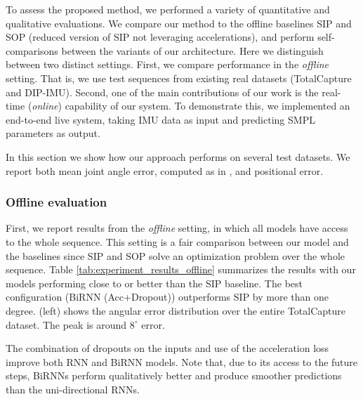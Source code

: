 \documentclass[acmtog]{acmart}
\begin{document}
To assess the proposed method, we performed a variety of quantitative and qualitative evaluations. We compare our method to the offline baselines SIP \cite{von2017sparse} and SOP (reduced version of SIP not leveraging accelerations), and perform self-comparisons between the variants of our architecture. Here we distinguish between two distinct settings. First, we compare performance in the \emph{offline} setting. That is, we use test sequences from existing real datasets (TotalCapture and DIP-IMU). Second, one of the main contributions of our work is the real-time (\emph{online}) capability of our system. To demonstrate this, we implemented an end-to-end live system, taking IMU data as input and predicting SMPL parameters as output. 

In this section we show how our approach performs on several test datasets. We report both mean joint angle error, computed as in \cite{von2017sparse}, and positional error.

\subsubsection{Offline evaluation}
First, we report results from the \emph{offline} setting, in which all models have access to the whole sequence. This setting is a fair comparison between our model and the baselines since SIP and SOP solve an optimization problem over the whole sequence. Table \ref{tab:experiment_results_offline} summarizes the results with our models performing close to or better than the SIP baseline. The best configuration (BiRNN (Acc+Dropout)) outperforms SIP by more than one degree.  (left) shows the angular error distribution over the entire TotalCapture dataset. The peak is around $8^\circ$ error.

The combination of dropouts on the inputs and use of the acceleration loss improve both RNN and BiRNN models. Note that, due to its access to the future steps, BiRNNs perform qualitatively better and produce smoother predictions than the uni-directional RNNs.
\end{document}
